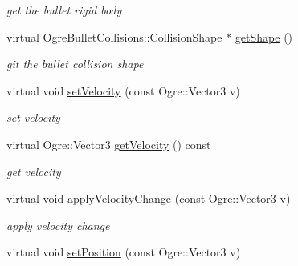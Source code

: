 \begin{DoxyCompactItemize}
\begin{DoxyCompactList}\small\item\em get the bullet rigid body \end{DoxyCompactList}\item 
virtual Ogre\+Bullet\+Collisions\+::\+Collision\+Shape $\ast$ \hyperlink{class_n_c_t_u_1_1_obstacle_aea41027c61d51df4d1ed72c5ad52ae62}{get\+Shape} ()\hypertarget{class_n_c_t_u_1_1_obstacle_aea41027c61d51df4d1ed72c5ad52ae62}{}\label{class_n_c_t_u_1_1_obstacle_aea41027c61d51df4d1ed72c5ad52ae62}

\begin{DoxyCompactList}\small\item\em git the bullet collision shape \end{DoxyCompactList}\item 
virtual void \hyperlink{class_n_c_t_u_1_1_obstacle_a80ef7f5311539939b7ab209c3f42357b}{set\+Velocity} (const Ogre\+::\+Vector3 v)\hypertarget{class_n_c_t_u_1_1_obstacle_a80ef7f5311539939b7ab209c3f42357b}{}\label{class_n_c_t_u_1_1_obstacle_a80ef7f5311539939b7ab209c3f42357b}

\begin{DoxyCompactList}\small\item\em set velocity \end{DoxyCompactList}\item 
virtual Ogre\+::\+Vector3 \hyperlink{class_n_c_t_u_1_1_obstacle_ae3cab20c9bb9dfd905325df76aec46b5}{get\+Velocity} () const \hypertarget{class_n_c_t_u_1_1_obstacle_ae3cab20c9bb9dfd905325df76aec46b5}{}\label{class_n_c_t_u_1_1_obstacle_ae3cab20c9bb9dfd905325df76aec46b5}

\begin{DoxyCompactList}\small\item\em get velocity \end{DoxyCompactList}\item 
virtual void \hyperlink{class_n_c_t_u_1_1_obstacle_a105d2a834de6357bbb159166ed6779ad}{apply\+Velocity\+Change} (const Ogre\+::\+Vector3 v)\hypertarget{class_n_c_t_u_1_1_obstacle_a105d2a834de6357bbb159166ed6779ad}{}\label{class_n_c_t_u_1_1_obstacle_a105d2a834de6357bbb159166ed6779ad}

\begin{DoxyCompactList}\small\item\em apply velocity change \end{DoxyCompactList}\item 
virtual void \hyperlink{class_n_c_t_u_1_1_obstacle_a992c5eabbae44f6c3c2b9cf564bde211}{set\+Position} (const Ogre\+::\+Vector3 v)\hypertarget{class_n_c_t_u_1_1_obstacle_a992c5eabbae44f6c3c2b9cf564bde211}{}\label{class_n_c_t_u_1_1_obstacle_a992c5eabbae44f6c3c2b9cf564bde211}


\end{DoxyCompactItemize}
